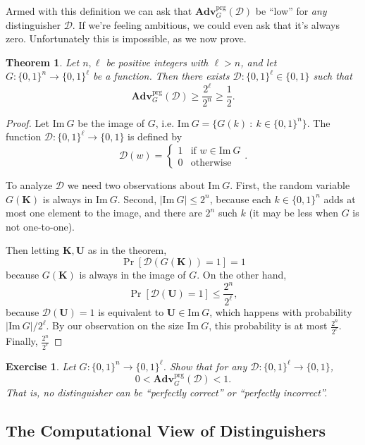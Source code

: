 \documentclass[11pt]{article}
\newtheorem{exercise}{Exercise}
\newtheorem{theorem}{Theorem}
\newcommand{\calD}{\mathcal{D}}
\newcommand{\Adv}{\mathbf{Adv}}
\newcommand{\AdvPRG}[2]{\Adv^{\mathrm{prg}}_{#1}({#2})}
\newcommand{\bits}{\{0,1\}}
\newcommand{\bK}{\mathbf{K}}
\newcommand{\bU}{\mathbf{U}}
\newcommand{\Img}{\mathrm{Im}}
\begin{document}
Armed with this definition we can ask that $\AdvPRG{G}{\calD}$ be ``low''
for \emph{any} distinguisher $\calD$. If we're feeling ambitious, we
could even ask that it's always zero. Unfortunately this is impossible,
as we now prove.
\begin{theorem}
    Let $n,\ell$ be positive integers with $\ell>n$, and let
    $G:\bits^n\to\bits^\ell$ be a function. Then there exists
    $\calD:\bits^\ell\in\bits$ such that
    \[
        \AdvPRG{G}{\calD} \geq \frac{2^\ell}{2^n} \geq \frac{1}{2}.
    \]
\end{theorem}
\begin{proof}
    Let $\Img\ G$ be the image of $G$, i.e. $\Img\ G = \{G(k) \ :\
    k\in\bits^n\}$.  The function $\calD:\bits^\ell\to\bits$ is defined by
    \[
        \calD(w) =
        \begin{cases}
            1 & \text{if $w\in\Img\ G$} \\
            0 & \text{otherwise}
        \end{cases}.
    \]
    
    To analyze $\calD$ we need two observations about $\Img\ G$. First, the
    random variable $G(\bK)$ is always in $\Img\ G$. Second, $|\Img\ G| \leq
    2^n$, because each $k\in\bits^n$ adds at most one element to the image, and
    there are $2^n$ such $k$ (it may be less when $G$ is not one-to-one).

    Then letting $\bK,\bU$ as in the theorem,
    \[
        \Pr[\calD(G(\bK))=1]=1
    \]
    because $G(\bK)$ is always in the image of $G$. On the other hand,
    \[
        \Pr[\calD(\bU)=1] \leq \frac{2^n}{2^\ell},
    \]
    because $\calD(\bU)=1$ is equivalent to $\bU\in\Img\ G$, which happens
    with probability $|\Img\ G|/2^\ell$. By our observation on the size
    $\Img\ G$, this probability is at most $\frac{2^n}{2^\ell}$. Finally,
    $\frac{2^n}{2^\ell}$
\end{proof}

\begin{exercise}
    Let $G:\bits^n\to\bits^\ell$. Show that for \emph{any}
    $\calD:\bits^\ell\to\bits$,
    \[
        0 < \AdvPRG{G}{\calD} < 1.
    \]
    That is, no distinguisher can be ``perfectly correct'' or ``perfectly
    incorrect''.
\end{exercise}

\subsection{The Computational View of Distinguishers}
\end{document}
